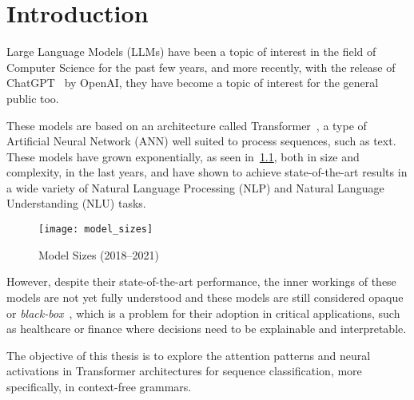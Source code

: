 \chapter{Introduction}

Large Language Models (LLMs) have been a topic of interest in the field of Computer Science for the past few years, 
and more recently, with the release of ChatGPT~\cite{chatgpt} by OpenAI, they have become a topic of interest for the general public too.

These models are based on an architecture called Transformer~\cite{attention_is_all_you_need}, a type of Artificial Neural Network (ANN) 
well suited to process sequences, such as text. These models have grown exponentially, as seen in~\ref{fig:model_sizes}, both in size and complexity, in the last years, and 
have shown to achieve state-of-the-art results in a wide variety of Natural Language Processing (NLP) and Natural Language Understanding (NLU) tasks.

\begin{figure}[H]
    \centering
    \texttt{[image: model\_sizes]}
    \caption{Model Sizes (2018--2021)~\cite{model_sizes}}
    \label{fig:model_sizes}
\end{figure}

However, despite their state-of-the-art performance, the inner workings of these models are not yet fully understood and these models are still considered opaque or \emph{black-box}~\cite{lei-etal-2016-rationalizing}, which is a problem for their adoption in critical applications, such as healthcare or finance 
where decisions need to be explainable and interpretable. 

The objective of this thesis is to explore the attention patterns and neural activations in Transformer architectures for sequence classification, more specifically, in context-free grammars.
